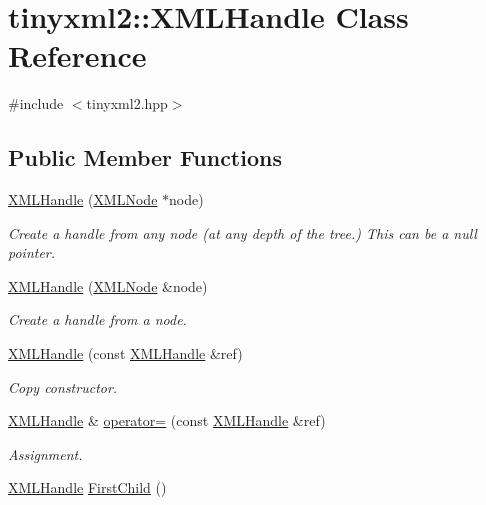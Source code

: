 \hypertarget{classtinyxml2_1_1_x_m_l_handle}{\section{tinyxml2\-:\-:X\-M\-L\-Handle Class Reference}
\label{classtinyxml2_1_1_x_m_l_handle}
}


{\ttfamily \#include $<$tinyxml2.\-hpp$>$}

\subsection*{Public Member Functions}
\begin{DoxyCompactItemize}
\item 
\hyperlink{classtinyxml2_1_1_x_m_l_handle_a9c240a35c18f053509b4b97ddccd9793}{X\-M\-L\-Handle} (\hyperlink{classtinyxml2_1_1_x_m_l_node}{X\-M\-L\-Node} $\ast$node)
\begin{DoxyCompactList}\small\item\em Create a handle from any node (at any depth of the tree.) This can be a null pointer. \end{DoxyCompactList}\item 
\hyperlink{classtinyxml2_1_1_x_m_l_handle_aa2edbc1c0d3e3e8259bd98de7f1cf500}{X\-M\-L\-Handle} (\hyperlink{classtinyxml2_1_1_x_m_l_node}{X\-M\-L\-Node} \&node)
\begin{DoxyCompactList}\small\item\em Create a handle from a node. \end{DoxyCompactList}\item 
\hyperlink{classtinyxml2_1_1_x_m_l_handle_afd8e01e6018c07347b8e6d80272466aa}{X\-M\-L\-Handle} (const \hyperlink{classtinyxml2_1_1_x_m_l_handle}{X\-M\-L\-Handle} \&ref)
\begin{DoxyCompactList}\small\item\em Copy constructor. \end{DoxyCompactList}\item 
\hyperlink{classtinyxml2_1_1_x_m_l_handle}{X\-M\-L\-Handle} \& \hyperlink{classtinyxml2_1_1_x_m_l_handle_a75b908322bb4b83be3281b6845252b20}{operator=} (const \hyperlink{classtinyxml2_1_1_x_m_l_handle}{X\-M\-L\-Handle} \&ref)
\begin{DoxyCompactList}\small\item\em Assignment. \end{DoxyCompactList}\item 
\hyperlink{classtinyxml2_1_1_x_m_l_handle}{X\-M\-L\-Handle} \hyperlink{classtinyxml2_1_1_x_m_l_handle_a536447dc7f54c0cd11e031dad94795ae}{First\-Child} ()

\end{DoxyCompactItemize}
